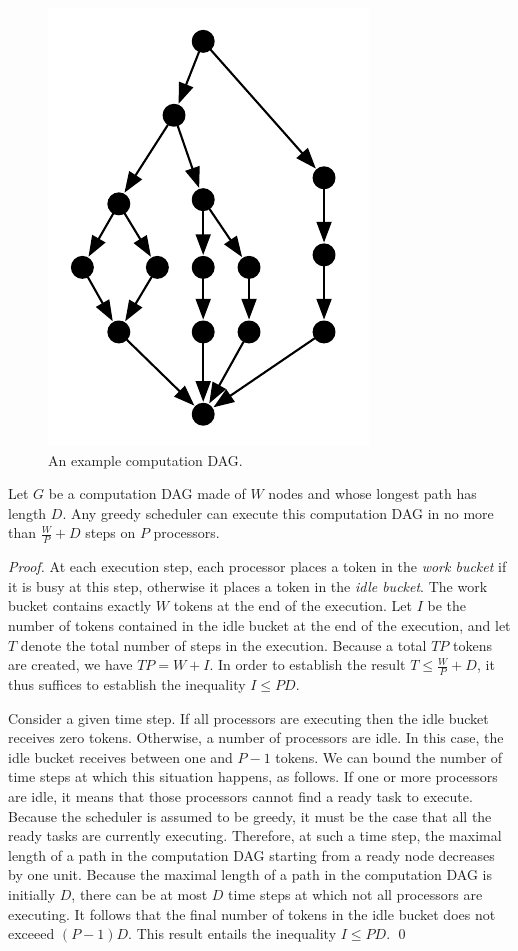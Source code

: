  

\begin{figure}
\centering
\ifx\arthur\false
\includegraphics[width=0.4\columnwidth]{pictures/computation-dag}
\fi
\caption{An example computation DAG.}
\label{fig:dag}
\end{figure}



\begin{theorem}
\label{thm:basic-brent}
Let $G$ be a computation DAG made of $W$ nodes and whose
longest path has length $D$.
Any greedy scheduler can 
execute this computation DAG in no more than $\frac{W}{P} + D$ 
steps on $P$ processors. 
\end{theorem}

\begin{proof}
At each execution step, each processor places a token in the {\em work bucket}
if it is busy at this step, otherwise it places a token in the {\em idle bucket}.
The work bucket contains exactly $W$ tokens at the end of the execution.
Let $I$ be the number of tokens contained in the idle bucket at the end of the
execution, and let $T$ denote the total number of steps in the execution.
Because a total $T P$ tokens are created, we have $T P = W + I$.
In order to establish the result $T \leq \frac{W}{P} + D$,
it thus suffices to establish the inequality $I \leq P D$.

Consider a given time step.
If all processors are executing then the idle bucket
receives zero tokens. Otherwise, a number of processors are idle.
In this case, the idle bucket receives between one and $P-1$ tokens.
We can bound the number of time steps at which this situation happens,
as follows. 
If one or more processors are idle, it means that those processors cannot
find a ready task to execute. Because the scheduler is assumed to be greedy,
it must be the case that all the ready tasks are currently executing.
Therefore, at such a time step, the maximal length of a path 
in the computation DAG starting from a ready node decreases by one unit. 
Because the maximal length of a path in the computation DAG is initially $D$,
there can be at most $D$ time steps at which not all processors are executing.
It follows that the final number of tokens in the idle bucket
does not exceeed $(P-1) D$. This result entails the inequality $I \leq P D$. \qed
\end{proof}


